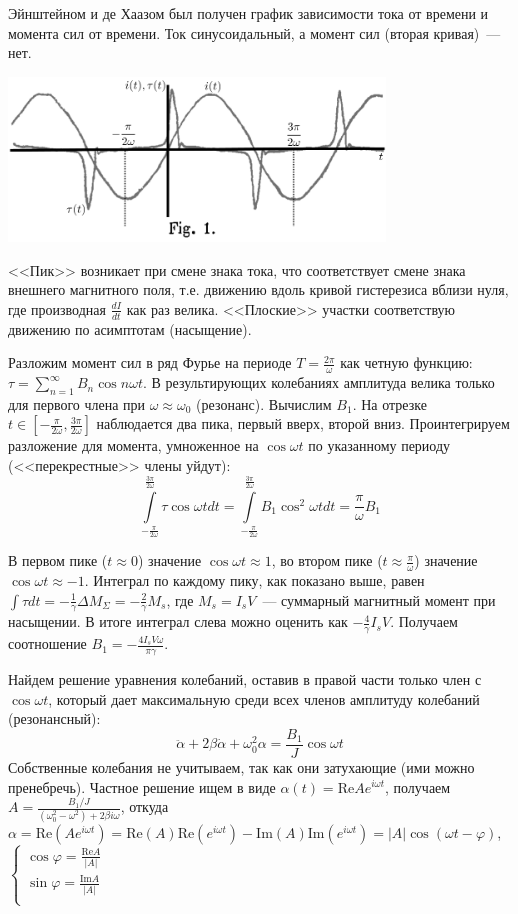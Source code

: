 \documentclass[a4paper]{article}
\begin{document}
Эйнштейном и де Хаазом был получен график зависимости тока от времени и момента сил от времени. Ток синусоидальный, а момент сил (вторая кривая)~--- нет.
\begin{center}
\includegraphics[width=10cm]{fig1.png}
\end{center}
<<Пик>> возникает при смене знака тока, что соответствует смене знака внешнего магнитного поля, т.е. движению вдоль кривой гистерезиса вблизи нуля, где производная $\frac{dI}{dt}$ как раз велика. <<Плоские>> участки соответствую движению по асимптотам (насыщение).

Разложим момент сил в ряд Фурье на периоде $T=\frac{2\pi}{\omega}$ как четную функцию: $\tau=\sum\limits_{n=1}^{\infty}B_n\cos n\omega t$. В результирующих колебаниях амплитуда велика только для первого члена при $\omega\approx\omega_0$ (резонанс). Вычислим $B_1$. На отрезке $t\in[-\frac{\pi}{2\omega},\frac{3\pi}{2\omega}]$ наблюдается два пика, первый вверх, второй вниз. Проинтегрируем разложение для момента, умноженное на $\cos\omega t$ по указанному периоду (<<перекрестные>> члены уйдут): $$\int\limits_{-\frac{\pi}{2\omega}}^{\frac{3\pi}{2\omega}}\tau\cos\omega tdt=\int\limits_{-\frac{\pi}{2\omega}}^{\frac{3\pi}{2\omega}}B_1\cos^2\omega tdt=\frac{\pi}{\omega}B_1$$

В первом пике ($t\approx0$) значение $\cos\omega t\approx 1$, во втором пике ($t\approx \frac{\pi}{\omega}$) значение $\cos\omega t\approx -1$. Интеграл по каждому пику, как показано выше, равен $\int \tau dt=-\frac{1}{\gamma}\Delta M_\Sigma=-\frac{2}{\gamma}M_s$, где $M_s=I_sV$~--- суммарный магнитный момент при насыщении. В итоге интеграл слева можно оценить как $-\frac{4}{\gamma}I_sV$. Получаем соотношение $B_1=-\frac{4I_sV\omega}{\pi\gamma}$.

Найдем решение уравнения колебаний, оставив в правой части только член с $\cos\omega t$, который дает максимальную среди всех членов амплитуду колебаний (резонансный):
$$
\ddot{\alpha}+2\beta\dot{\alpha}+\omega_0^2\alpha=\frac{B_1}{J}\cos\omega t
$$
Собственные колебания не учитываем, так как они затухающие (ими можно пренебречь). Частное решение ищем в виде $\alpha(t)=\mbox{Re} Ae^{i\omega t}$, получаем $A=\frac{B_1/J}{(\omega_0^2-\omega^2)+2\beta i\omega}$, откуда $\alpha=\mbox{Re}(Ae^{i\omega t})=\mbox{Re}(A)\mbox{Re}(e^{i\omega t})-\mbox{Im}(A)\mbox{Im}(e^{i\omega t})=|A|\cos(\omega t-\varphi)$, $\begin{cases}
\cos\varphi=\frac{\mbox{Re}A}{|A|}\\
\sin\varphi=\frac{\mbox{Im}A}{|A|}\\
\end{cases}$
\end{document}
